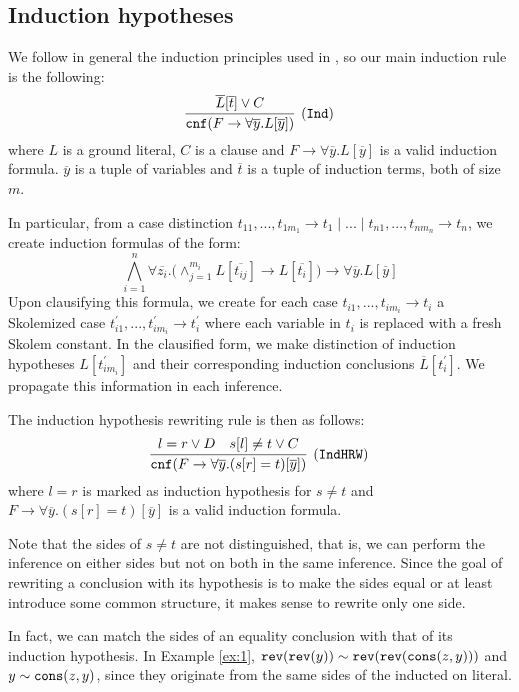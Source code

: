 \subsection{Induction hypotheses}
We follow in general the induction principles used in \cite{vampireinduction,vampiregeneralization}, so our main induction rule is the following:
\begin{equation*}
\infer[\small{\tt (Ind)}]{\mathtt{cnf}(F \rightarrow \forall \overline{y}.L[\overline{y}])}{\overline{L}[\overline{t}] \lor C}
\end{equation*}
where $L$ is a ground literal, $C$ is a clause and $F \rightarrow \forall \overline{y}.L[\overline{y}]$ is a valid induction formula. $\overline{y}$ is a tuple of variables and $\overline{t}$ is a tuple of induction terms, both of size $m$.

In particular, from a case distinction $t_{11},...,t_{1{m_1}}\rightarrow t_1\mid...\mid t_{n1},...,t_{n{m_n}}\rightarrow t_n$, we create induction formulas of the form:
$$\bigwedge_{i=1}^{n}\forall \overline{z_i}.\bigg(\wedge_{j=1}^{m_i}L[\overline{t_{ij}}]\rightarrow L[\overline{t_i}]\bigg)\rightarrow \forall \overline{y}.L[\overline{y}]$$
Upon clausifying this formula, we create for each case $t_{i1},...,t_{i{m_i}}\rightarrow t_i$ a Skolemized case $t_{i1}^\prime,...,t_{i{m_i}}^\prime\rightarrow t_i^\prime$ where each variable in $t_i$ is replaced with a fresh Skolem constant. In the clausified form, we make distinction of induction hypotheses $L[t_{i{m_i}}^\prime]$ and their corresponding induction conclusions $\overline{L}[t_i^\prime]$. We propagate this information in each inference.

The induction hypothesis rewriting rule is then as follows:
\begin{equation*}
\infer[\small{\tt (IndHRW)}]{\mathtt{cnf}(F \rightarrow \forall \overline{y}.(s[r]=t)[\overline{y}])}{l=r \lor D& s[l]\neq t \lor C}
\end{equation*}
where $l=r$ is marked as induction hypothesis for $s\neq t$ and $F \rightarrow \forall \overline{y}.(s[r]=t)[\overline{y}]$ is a valid induction formula.

Note that the sides of $s\neq t$ are not distinguished, that is, we can perform the inference on either sides but not on both in the same inference. Since the goal of rewriting a conclusion with its hypothesis is to make the sides equal or at least introduce some common structure, it makes sense to rewrite only one side.

In fact, we can match the sides of an equality conclusion with that of its induction hypothesis. In Example \ref{ex:1}, $\mathtt{rev}(\mathtt{rev}(y))\sim\mathtt{rev}(\mathtt{rev}(\mathtt{cons}(z,y)))$ and $y\sim\mathtt{cons}(z,y)$, since they originate from the same sides of the inducted on literal.


